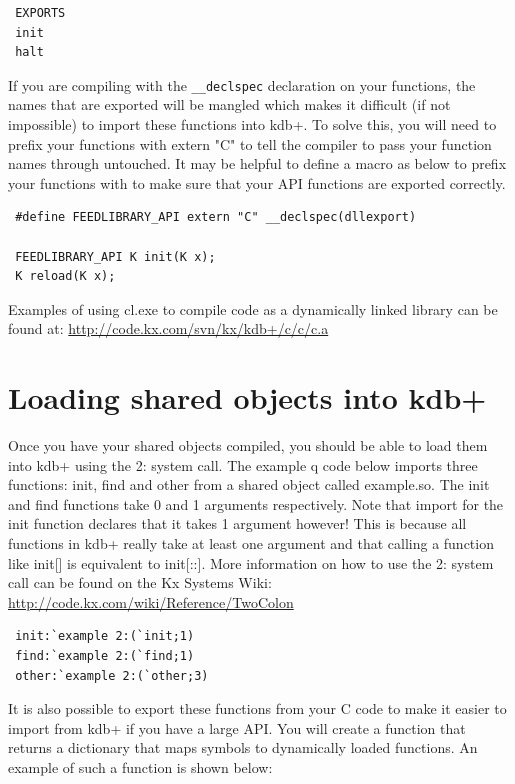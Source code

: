 \begin{lstlisting}
 EXPORTS
 init
 halt
 \end{lstlisting}
 
 If you are compiling with the \verb|__declspec| declaration on your functions, the names that are exported will be mangled which makes it difficult (if not impossible) to import these functions into kdb+. To solve this, you will need to prefix your functions with extern "C" to tell the compiler to pass your function names through untouched. It may be helpful to define a macro as below to prefix your functions with to make sure that your API functions are exported correctly.

 \begin{lstlisting}
 #define FEEDLIBRARY_API extern "C" __declspec(dllexport)
 
 FEEDLIBRARY_API K init(K x);
 K reload(K x);
 \end{lstlisting}
 
 Examples of using cl.exe to compile code as a dynamically linked library can be found at: \url{http://code.kx.com/svn/kx/kdb+/c/c/c.a}
 
 \section{Loading shared objects into kdb+}
 
 Once you have your shared objects compiled, you should be able to load them into kdb+ using the 2: system call. The example q code below imports three functions: init, find and other from a shared object called example.so. The init and find functions take 0 and 1 arguments respectively. Note that import for the init function declares that it takes 1 argument however! This is because all functions in kdb+ really take at least one argument and that calling a function like init[] is equivalent to init[::]. More information on how to use the 2: system call can be found on the Kx Systems Wiki: \url{http://code.kx.com/wiki/Reference/TwoColon}
 
 \begin{lstlisting}
 init:`example 2:(`init;1)
 find:`example 2:(`find;1)
 other:`example 2:(`other;3)
 \end{lstlisting}
 
 It is also possible to export these functions from your C code to make it easier to import from kdb+ if you have a large API. You will create a function that returns a dictionary that maps symbols to dynamically loaded functions. An example of such a function is shown below:
 
